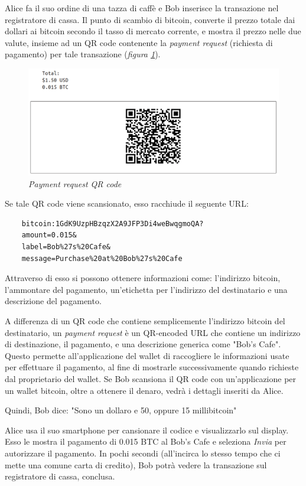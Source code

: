 Alice fa il suo ordine di una tazza di caffè e Bob inserisce la transazione nel registratore di cassa. Il punto di scambio di bitcoin, converte il prezzo totale dai dollari ai bitcoin secondo il tasso di mercato corrente, e mostra il prezzo nelle due valute, insieme ad un QR code contenente la \textit{payment request} (richiesta di pagamento) per tale transazione (\textit{figura \ref{fig:qrcode}}).
\begin{figure}[h]
	\centering
	\includegraphics[width= 0.8 \linewidth]{figure/qrcode}
	\caption{\textit{Payment request QR code} \label{fig:qrcode}}
\end{figure}

Se tale QR code viene scansionato, esso racchiude il seguente URL:
\begin{lstlisting}
	bitcoin:1GdK9UzpHBzqzX2A9JFP3Di4weBwqgmoQA?
	amount=0.015&
	label=Bob%27s%20Cafe&
	message=Purchase%20at%20Bob%27s%20Cafe
\end{lstlisting}

Attraverso di esso si possono ottenere informazioni come: l'indirizzo bitcoin, l'ammontare del pagamento, un'etichetta per l'indirizzo del destinatario e una descrizione del pagamento.

A differenza di un QR code che contiene semplicemente l'indirizzo bitcoin del destinatario, un \textit{payment request} è un QR-encoded URL che contiene un indirizzo di destinazione, il pagamento, e una descrizione generica come "Bob's Cafe". Questo permette all'applicazione del wallet di raccogliere le  informazioni usate per effettuare il pagamento, al fine di mostrarle successivamente quando richieste dal proprietario del wallet. Se Bob scansiona il QR code con un'applicazione per un wallet bitcoin, oltre a ottenere il denaro, vedrà i dettagli inseriti da Alice.

Quindi, Bob dice: "Sono un dollaro e 50, oppure 15 millibitcoin"

Alice usa il suo smartphone per cansionare il codice e visualizzarlo sul display. Esso le mostra il pagamento di 0.015 BTC al Bob's Cafe e seleziona \textit{Invia} per autorizzare il pagamento. In pochi secondi (all'incirca lo stesso tempo che ci mette una comune carta di credito), Bob potrà vedere la transazione sul registratore di cassa, conclusa.\cite{antonopoulos2014mastering}

